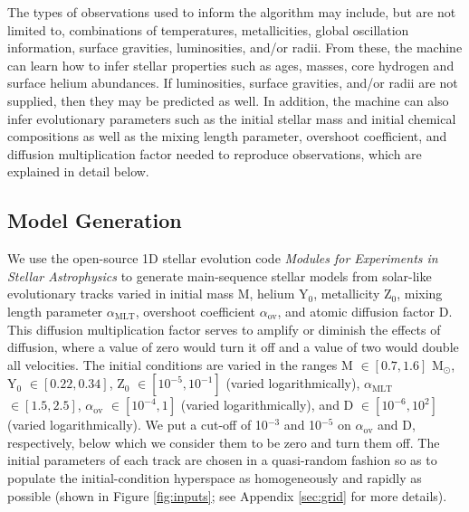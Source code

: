 \documentclass[manuscript,linenumbers]{aastex6}
\begin{document}
The types of observations used to inform the algorithm may include, but are not limited to, combinations of temperatures, metallicities, global oscillation information, surface gravities, luminosities, and/or radii. From these, the machine can learn how to infer stellar properties such as ages, masses, core hydrogen and surface helium abundances. If luminosities, surface gravities, and/or radii are not supplied, then they may be predicted as well. In addition, the machine can also infer evolutionary parameters such as the initial stellar mass and initial chemical compositions as well as the mixing length parameter, overshoot coefficient, and diffusion multiplication factor needed to reproduce observations, which are explained in detail below. 

\subsection{Model Generation}
\label{sec:models}
We use the open-source 1D stellar evolution code \emph{Modules for Experiments in Stellar Astrophysics} \citep[MESA;][]{Paxton2011} to generate main-sequence stellar models from solar-like evolutionary tracks varied in initial mass M, helium Y$_0$, metallicity Z$_0$, mixing length parameter $\alpha_{\text{MLT}}$, overshoot coefficient $\alpha_{\text{ov}}$, and atomic diffusion factor D. This diffusion multiplication factor serves to amplify or diminish the effects of diffusion, where a value of zero would turn it off and a value of two would double all velocities. The initial conditions are varied in the ranges M $\in [0.7, 1.6]$ M$_\odot$, Y$_0$ $\in [0.22, 0.34]$, Z$_0$ $\in [10^{-5}, 10^{-1}]$ (varied logarithmically), $\alpha_{\text{MLT}}$ $\in [1.5, 2.5]$, $\alpha_{\text{ov}}$ $\in [10^{-4}, 1]$ (varied logarithmically), and D $\in [10^{-6}, 10^2]$ (varied logarithmically). We put a cut-off of 10$^{-3}$ and 10$^{-5}$ on $\alpha_{\text{ov}}$ and D, respectively, below which we consider them to be zero and turn them off. The initial parameters of each track are chosen in a quasi-random fashion so as to populate the initial-condition hyperspace as homogeneously and rapidly as possible (shown in Figure \ref{fig:inputs}; see Appendix \ref{sec:grid} for more details). %
\end{document}
